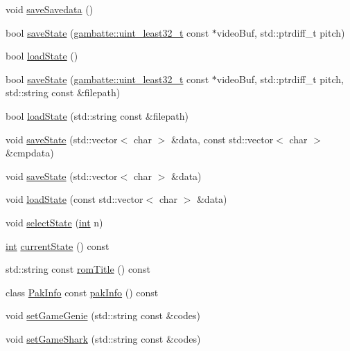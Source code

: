 \begin{DoxyCompactItemize}
\item 
void \hyperlink{classgambatte_1_1GB_a465fec5e623d8ec44c4c00fed15ed387}{save\+Savedata} ()
\item 
bool \hyperlink{classgambatte_1_1GB_a4762c3580bafcdd7635988ee8b034869}{save\+State} (\hyperlink{namespacegambatte_a0639f09fccfbbd5a8e0796318768e370}{gambatte\+::uint\+\_\+least32\+\_\+t} const $\ast$video\+Buf, std\+::ptrdiff\+\_\+t pitch)
\item 
bool \hyperlink{classgambatte_1_1GB_a70781b0ddbfd7d52ae6bc0db1c34be0d}{load\+State} ()
\item 
bool \hyperlink{classgambatte_1_1GB_a98b621fc4632d6c815c6eeb31a59d972}{save\+State} (\hyperlink{namespacegambatte_a0639f09fccfbbd5a8e0796318768e370}{gambatte\+::uint\+\_\+least32\+\_\+t} const $\ast$video\+Buf, std\+::ptrdiff\+\_\+t pitch, std\+::string const \&filepath)
\item 
bool \hyperlink{classgambatte_1_1GB_a7ac605f7586d955acb408a649bc3faf1}{load\+State} (std\+::string const \&filepath)
\item 
void \hyperlink{classgambatte_1_1GB_af6c45af52b0ec127ddcb00a2d32d6b18}{save\+State} (std\+::vector$<$ char $>$ \&data, const std\+::vector$<$ char $>$ \&cmpdata)
\item 
void \hyperlink{classgambatte_1_1GB_a26dfbfcb3487893188f74bd419c8f23e}{save\+State} (std\+::vector$<$ char $>$ \&data)
\item 
void \hyperlink{classgambatte_1_1GB_a8745c11c1ab010ac43147d537c35fb79}{load\+State} (const std\+::vector$<$ char $>$ \&data)
\item 
void \hyperlink{classgambatte_1_1GB_a231371a6ef7aa0001afa45d645052569}{select\+State} (\hyperlink{ioapi_8h_a787fa3cf048117ba7123753c1e74fcd6}{int} n)
\item 
\hyperlink{ioapi_8h_a787fa3cf048117ba7123753c1e74fcd6}{int} \hyperlink{classgambatte_1_1GB_a48d11dcf693f45ab861f640d8fa96dc9}{current\+State} () const
\item 
std\+::string const \hyperlink{classgambatte_1_1GB_ad3eeb7e32908992b471c44936f05f8ea}{rom\+Title} () const
\item 
class \hyperlink{classgambatte_1_1PakInfo}{Pak\+Info} const \hyperlink{classgambatte_1_1GB_a53f8602582e710cb1938ff6d1306bde9}{pak\+Info} () const
\item 
void \hyperlink{classgambatte_1_1GB_ab39e81dad0d44900154c8c555b39d35c}{set\+Game\+Genie} (std\+::string const \&codes)
\item 
void \hyperlink{classgambatte_1_1GB_a056a4e6a182ef54c54afff0516b3721c}{set\+Game\+Shark} (std\+::string const \&codes)

\end{DoxyCompactItemize}
